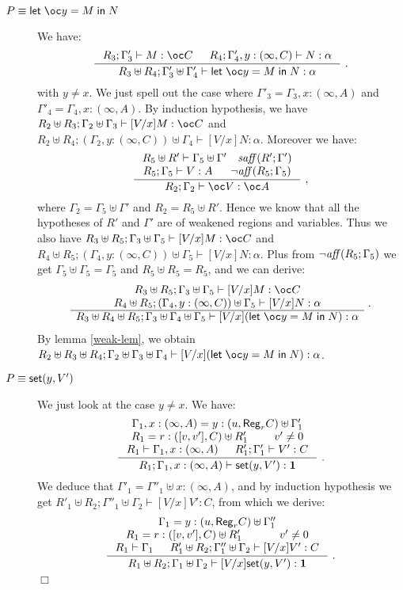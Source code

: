 \documentclass[11pt]{article}
\newcommand{\qed}{\hfill${\Box}$}
\newcommand{\infer}[2]{\begin{array}{c} #1 \\ \hline #2 \end{array}}
\newcommand{\st}[2]{{\sf set}(#1,#2)}
\newcommand{\regtype}[2]{{\sf Reg}_{#1} #2}
\newcommand{\upair}[2]{[#1,#2]}
\newcommand{\letb}[3]{\mathsf{let}\;\oc #1 = #2\;\mathsf{in}\;#3}
\begin{document}
\begin{description}
  \item[$P \equiv \letb{y}{M}{N}$] We have:
    $$
    \inference
    {R_3;\Gamma'_3\vdash M:\oc C & R_4;\Gamma'_4,y:(\infty,C)\vdash N:\alpha}
    {R_3\uplus R_4;\Gamma'_3\uplus\Gamma'_4\vdash \letb{y}{M}{N}:\alpha}~.
    $$
    with $y\neq x$. We just spell out the case where $\Gamma'_3 =
    \Gamma_3,x:(\infty,A)$ and
    $\Gamma'_4 =\Gamma_4,x:(\infty,A)$.
By induction hypothesis, we have $R_2\uplus
R_3;\Gamma_2\uplus\Gamma_3\vdash [V/x]M:\oc C$ and $R_2\uplus
R_4;(\Gamma_2,y:(\infty,C))\uplus\Gamma_4\vdash
[V/x]N:\alpha$. Moreover we have:
      $$
      \inference
      {R_5\uplus R'\vdash \Gamma_5\uplus\Gamma'\quad \w{saff}(R';\Gamma')\\
        R_5;\Gamma_5\vdash V:A & \neg \w{aff}(R_5;\Gamma_5)}
      {R_2;\Gamma_2\vdash\oc V:\oc A}~,
      $$ 
where $\Gamma_2=\Gamma_5\uplus\Gamma'$ and $R_2=R_5\uplus
      R'$. Hence we know that all the hypotheses of $R'$ and $\Gamma'$
      are of weakened regions and variables. Thus we also have
      $R_3\uplus R_5;\Gamma_3\uplus\Gamma_5\vdash [V/x]M:\bang C$ and
      $R_4\uplus R_5;(\Gamma_4,y:(\infty,C))\uplus\Gamma_5\vdash
      [V/x]N:\alpha$. Plus from $\neg {\it aff}(R_5;\Gamma_5)$ we get
      $\Gamma_5\uplus\Gamma_5=\Gamma_5$ and $R_5\uplus R_5=R_5$, and
      we can derive:
      $$
\infer{
\begin{array}{c}
R_3\uplus R_5;\Gamma_3\uplus\Gamma_5\vdash [V/x]M:\bang C \\
R_4\uplus R_5;(\Gamma_4,y:(\infty,C))\uplus\Gamma_5\vdash
      [V/x]N:\alpha
\end{array}}
{R_3\uplus R_4\uplus R_5;\Gamma_3\uplus\Gamma_4\uplus\Gamma_5\vdash [V/x](\letb{y}{M}{N}):\alpha}~.
      $$
By lemma \ref{weak-lem}, we obtain $R_2\uplus R_3\uplus
R_4;\Gamma_2\uplus\Gamma_3\uplus\Gamma_4\vdash
[V/x](\letb{y}{M}{N}):\alpha$.


 \item[$P \equiv \st{y}{V'}$] We just look at the case $y\neq x$. We
    have:
    $$
    \inference
    {\Gamma_1,x:(\infty,A)=y:(u,\regtype{r}C)\uplus\Gamma'_1\\
      R_1=r:(\upair{v}{v'},C)\uplus R'_1 & v' \neq 0\\
      R_1\vdash\Gamma_1,x:(\infty,A) & R'_1;\Gamma'_1\vdash V':C}
    {R_1;\Gamma_1,x:(\infty,A) \vdash \st{y}{V'}:\tertype}~.
    $$
    We deduce that $\Gamma'_1=\Gamma''_1\uplus x:(\infty,A)$, and by
    induction hypothesis we get $R'_1\uplus
    R_2;\Gamma''_1\uplus\Gamma_2\vdash [V/x]V':C$, from which we
    derive:
    $$
    \inference
    {\Gamma_1=y:(u,\regtype{r}C)\uplus\Gamma''_1\\
      R_1=r:(\upair{v}{v'},C)\uplus R'_1 & v' \neq 0\\
      R_1\vdash\Gamma_1 & R'_1\uplus R_2;\Gamma''_1\uplus\Gamma_2\vdash [V/x]V':C}
    {R_1 \uplus R_2 ;\Gamma_1\uplus \Gamma_2 \vdash [V/x]\st{y}{V'}:\tertype}    ~.
    $$ \qed
\end{description}
\end{document}

